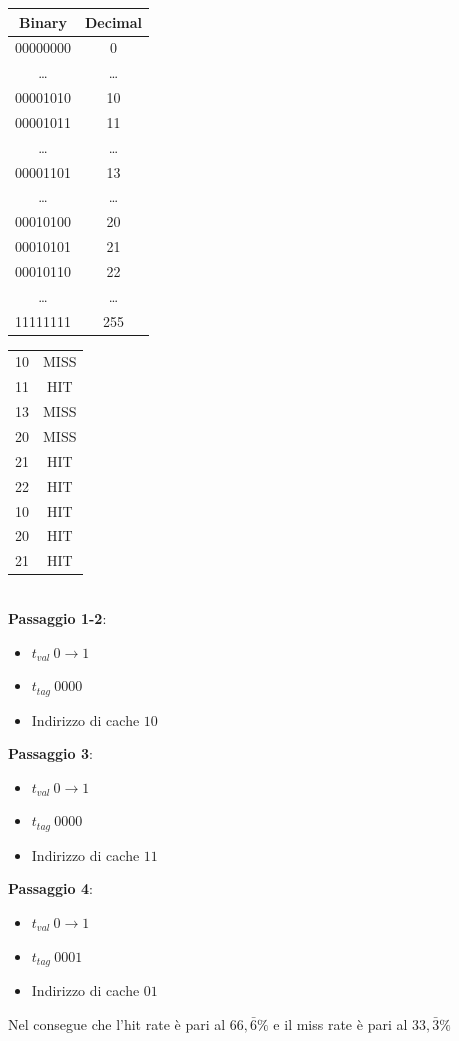 \documentclass[12pt,a4paper]{article}
\begin{document}
\begin{minipage}{.45\linewidth}
\begin{center}
\begin{tabular}{|c|c|}
\hline
\textbf{Binary} & \textbf{Decimal} \\ \hline
00000000 & 0 \\ \hline
… & … \\ \hline
00001010 & 10 \\ \hline
00001011 & 11 \\ \hline
… & … \\ \hline
00001101 & 13 \\ \hline
… & … \\ \hline
00010100 & 20 \\ \hline
00010101 & 21 \\ \hline
00010110 & 22 \\ \hline
… & … \\ \hline
11111111 & 255 \\ \hline
\end{tabular}
\begin{tabular}{cc}
10 & {\color[HTML]{FE0000} MISS} \\
11 & {\color[HTML]{32CB00} HIT} \\
13 & {\color[HTML]{FE0000} MISS} \\
20 & {\color[HTML]{FE0000} MISS} \\
21 & {\color[HTML]{32CB00} HIT} \\
22 & {\color[HTML]{32CB00} HIT} \\
10 & {\color[HTML]{32CB00} HIT} \\
20 & {\color[HTML]{32CB00} HIT} \\
21 & {\color[HTML]{32CB00} HIT}
\end{tabular}
\end{center}
\end{minipage}\\

\Sep \noindent
\textbf{Passaggio 1-2}:\begin{itemize}
\item $t_{val} \ 0 \rightarrow 1$
\item $t_{tag} \ 0000$
\item Indirizzo di cache $10$
\end{itemize}
\textbf{Passaggio 3}:
\begin{itemize}
\item $t_{val} \ 0 \rightarrow 1$
\item $t_{tag} \ 0000$
\item Indirizzo di cache $11$
\end{itemize}
\textbf{Passaggio 4}:
\begin{itemize}
\item $t_{val} \ 0 \rightarrow 1$
\item $t_{tag} \ 0001$
\item Indirizzo di cache $01$
\end{itemize}
Nel consegue che l'hit rate è pari al $66,\bar 6\%$ e il miss rate è pari al $33, \bar 3\%$
\end{document}
